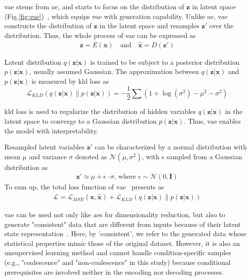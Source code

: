 \documentclass[twoside,twocolumn,9pt]{article}
\begin{document}
\acrshort*{vae} stems from \acrshort*{ae}, and starts to focus on the distribution of $\mathbf{z}$ in latent space (Fig.\ref{fig:vae})~\cite{kingma2014auto}, which equips \acrshort*{vae} with generation capability. Unlike \acrshort*{ae}, \acrshort*{vae} constructs the distribution of $\mathbf{z}$ in the latent space and resamples $\mathbf{z'}$ over the distribution. Thus, the whole process of \acrshort*{vae} can be expressed as
\begin{align} \label{MSE}
    \mathbf{z} = E(\mathbf{x}) \quad \textrm {and} \quad  \hat{\mathbf{x}} = D(\mathbf{z'})
\end{align}

Latent distribution $q(\mathbf{z}|\mathbf{x})$ is trained to be subject to a posterior distribution $p(\mathbf{z|\mathbf{x}})$, usually assumed Gaussian. The approximation between $q(\mathbf{z}|\mathbf{x})$ and $p(\mathbf{z|\mathbf{x}})$ is measured by \acrfull*{kld} loss as 
\begin{equation}
\mathcal{L}_{KLD}(q(\mathbf{z|x}) \| p(\mathbf{z|x})) = - \frac{1}{2} \sum\left(1+\log (\sigma^2)-\mu^2-\sigma^2 \right) 
\end{equation}

\acrshort*{kld} loss is used to regularize the distribution of hidden variables $q(\mathbf{z}|\mathbf{x})$  in the latent space to converge to a Gaussian distribution $p(\mathbf{z|\mathbf{x}})$. Thus, \acrshort*{vae} enables the model with interpretability. 

Resampled latent variables $\mathbf{z'}$ can be characterized by a normal distribution with mean $\mu$ and variance $\sigma$ denoted as $\mathcal{N}(\mu,\sigma^2)$, with $\epsilon$ sampled from a Gaussian distribution as
\begin{align}
    \mathbf{z'} \approx \mu + \epsilon \cdot \sigma \textrm{, where } \epsilon \sim \mathcal{N}(0,\mathbf{I}) 
    \label{eq:reparameterization}
\end{align}
To sum up, the total loss function of \acrshort*{vae}~\cite{esmaeili2019structured} presents as 
\begin{align}
   \mathcal{L} = \mathcal{L}_{MSE}(\mathbf{x}, \hat{\mathbf{x}}) + \mathcal{L}_{KLD}(q(\mathbf{z|x}) \| p(\mathbf{z|x}))
\end{align}

\acrshort*{vae} can be used not only like \acrshort*{ae}s for dimensionality reduction, but also to generate "consistent" data that are different from inputs because of their latent state representation~\cite{chagot2022surfactant}. Here, by 'consistent', we refer to the generated data whose statistical properties mimic those of the original dataset. However, it is also an unsupervised learning method and cannot handle condition-specific samples~\cite{zhao2017learning} (e.g., "coalescence" and "non-coalescence" in this study) because conditional prerequisites are involved  neither in the encoding nor decoding processes. 
%
%
\end{document}

